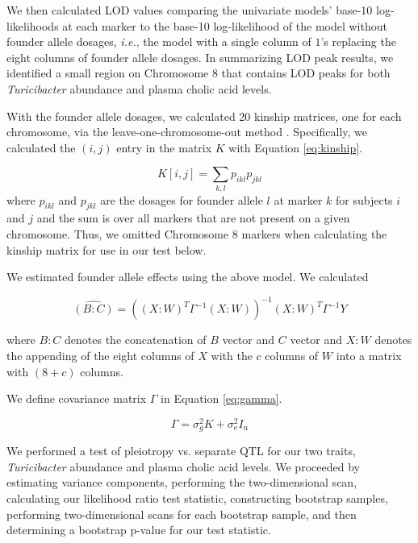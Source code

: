 \documentclass{book}
\begin{document}
We then calculated LOD values comparing the univariate models' base-10 log-likelihoods  at each marker to the base-10 log-likelihood of the model without founder allele dosages, \emph{i.e.}, the model with a single column of $1$'s replacing the eight columns of founder allele dosages. In summarizing LOD peak results, we identified a small region on Chromosome 8 that contains LOD peaks for both \emph{Turicibacter} abundance and plasma cholic acid levels.


With the founder allele dosages, we calculated 20 kinship matrices, one for each chromosome, via the leave-one-chromosome-out method \citep{yang2014advantages}. Specifically, we calculated the $(i, j)$ entry in the matrix $K$ with Equation \ref{eq:kinship}.

\begin{equation}
K[i, j] = \sum_{k,l}p_{ikl}p_{jkl}
\label{eq:kinship}
\end{equation}
where $p_{ikl}$ and $p_{jkl}$ are the dosages for founder allele $l$ at marker $k$ for subjects $i$ and $j$ and the sum is over all markers that are not present on a given chromosome. Thus, we omitted Chromosome 8 markers when calculating the kinship matrix for use in our test below. 



We estimated founder allele effects using the above model. We calculated

\begin{equation}
\widehat{(B:C)} = \left((X:W)^T\Gamma^{-1}(X:W)\right)^{-1}(X:W)^T\Gamma^{-1}Y
\label{eq:allele-effects}
\end{equation}

where $B:C$ denotes the concatenation of $B$ vector and $C$ vector and $X:W$ denotes the appending of the eight columns of $X$ with the $c$ columns of $W$ into a matrix with $(8 + c)$ columns. 

We define covariance matrix $\Gamma$ in Equation \ref{eq:gamma}.

\begin{equation}
\Gamma = \sigma^2_g K + \sigma^2_e I_n
\label{eq:gamma}
\end{equation}


We performed a test of pleiotropy vs. separate QTL for our two traits, \emph{Turicibacter} abundance and plasma cholic acid levels. We proceeded by estimating variance components, performing the two-dimensional scan, calculating our likelihood ratio test statistic, constructing bootstrap samples, performing two-dimensional scans for each bootstrap sample, and then determining a bootstrap p-value for our test statistic.
\end{document}
